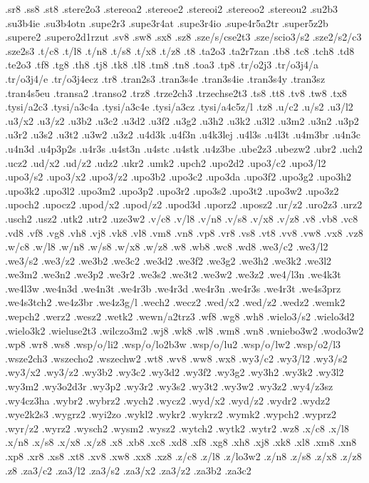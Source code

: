 {.sr8
.ss8
.st8
.stere2o3
.stereoa2
.stereoe2
.stereoi2
.stereoo2
.stereou2
.su2b3
.su3b4ie
.su3b4otn
.supe2r3
.supe3r4at
.supe3r4io
.supe4r5a2tr
.super5z2b
.supere2
.supero2d1rzut
.sv8
.sw8
.sx8
.sz8
.sze/s/cse2t3
.sze/scio3/s2
.sze2/s2/c3
.sze2s3
.t/c8
.t/l8
.t/n8
.t/s8
.t/x8
.t/z8
.t8
.ta2o3
.ta2r7zan
.tb8
.tc8
.tch8
.td8
.te2o3
.tf8
.tg8
.th8
.tj8
.tk8
.tl8
.tm8
.tn8
.toa3
.tp8
.tr/o2j3
.tr/o3j4/a
.tr/o3j4/e
.tr/o3j4ecz
.tr8
.tran2s3
.tran3s4e
.tran3s4ie
.tran3s4y
.tran3sz
.tran4s5eu
.transa2
.transo2
.trz8
.trze2ch3
.trzechse2t3
.ts8
.tt8
.tv8
.tw8
.tx8
.tysi/a2c3
.tysi/a3c4a
.tysi/a3c4e
.tysi/a3cz
.tysi/a4c5z/l
.tz8
.u/c2
.u/s2
.u3/l2
.u3/x2
.u3/z2
.u3b2
.u3c2
.u3d2
.u3f2
.u3g2
.u3h2
.u3k2
.u3l2
.u3m2
.u3n2
.u3p2
.u3r2
.u3s2
.u3t2
.u3w2
.u3z2
.u4d3k
.u4f3n
.u4k3lej
.u4l3s
.u4l3t
.u4m3br
.u4n3c
.u4n3d
.u4p3p2s
.u4r3s
.u4st3n
.u4stc
.u4stk
.u4z3be
.ube2z3
.ubezw2
.ubr2
.uch2
.ucz2
.ud/x2
.ud/z2
.udz2
.ukr2
.umk2
.upch2
.upo2d2
.upo3/c2
.upo3/l2
.upo3/s2
.upo3/x2
.upo3/z2
.upo3b2
.upo3c2
.upo3da
.upo3f2
.upo3g2
.upo3h2
.upo3k2
.upo3l2
.upo3m2
.upo3p2
.upo3r2
.upo3s2
.upo3t2
.upo3w2
.upo3z2
.upoch2
.upocz2
.upod/x2
.upod/z2
.upod3d
.uporz2
.uposz2
.ur/z2
.uro2z3
.urz2
.usch2
.usz2
.utk2
.utr2
.uze3w2
.v/c8
.v/l8
.v/n8
.v/s8
.v/x8
.v/z8
.v8
.vb8
.vc8
.vd8
.vf8
.vg8
.vh8
.vj8
.vk8
.vl8
.vm8
.vn8
.vp8
.vr8
.vs8
.vt8
.vv8
.vw8
.vx8
.vz8
.w/c8
.w/l8
.w/n8
.w/s8
.w/x8
.w/z8
.w8
.wb8
.wc8
.wd8
.we3/c2
.we3/l2
.we3/s2
.we3/z2
.we3b2
.we3c2
.we3d2
.we3f2
.we3g2
.we3h2
.we3k2
.we3l2
.we3m2
.we3n2
.we3p2
.we3r2
.we3s2
.we3t2
.we3w2
.we3z2
.we4/l3n
.we4k3t
.we4l3w
.we4n3d
.we4n3t
.we4r3b
.we4r3d
.we4r3n
.we4r3s
.we4r3t
.we4s3prz
.we4s3tch2
.we4z3br
.we4z3g/l
.wech2
.wecz2
.wed/x2
.wed/z2
.wedz2
.wemk2
.wepch2
.werz2
.wesz2
.wetk2
.wewn/a2trz3
.wf8
.wg8
.wh8
.wielo3/s2
.wielo3d2
.wielo3k2
.wieluse2t3
.wilczo3m2
.wj8
.wk8
.wl8
.wm8
.wn8
.wniebo3w2
.wodo3w2
.wp8
.wr8
.ws8
.wsp/o/li2
.wsp/o/lo2b3w
.wsp/o/lu2
.wsp/o/lw2
.wsp/o2/l3
.wsze2ch3
.wszecho2
.wszechw2
.wt8
.wv8
.ww8
.wx8
.wy3/c2
.wy3/l2
.wy3/s2
.wy3/x2
.wy3/z2
.wy3b2
.wy3c2
.wy3d2
.wy3f2
.wy3g2
.wy3h2
.wy3k2
.wy3l2
.wy3m2
.wy3o2d3r
.wy3p2
.wy3r2
.wy3s2
.wy3t2
.wy3w2
.wy3z2
.wy4/z3sz
.wy4cz3ha
.wybr2
.wybrz2
.wych2
.wycz2
.wyd/x2
.wyd/z2
.wydr2
.wydz2
.wye2k2s3
.wygrz2
.wyi2zo
.wykl2
.wykr2
.wykrz2
.wymk2
.wypch2
.wyprz2
.wyr/z2
.wyrz2
.wysch2
.wysm2
.wysz2
.wytch2
.wytk2
.wytr2
.wz8
.x/c8
.x/l8
.x/n8
.x/s8
.x/x8
.x/z8
.x8
.xb8
.xc8
.xd8
.xf8
.xg8
.xh8
.xj8
.xk8
.xl8
.xm8
.xn8
.xp8
.xr8
.xs8
.xt8
.xv8
.xw8
.xx8
.xz8
.z/c8
.z/l8
.z/lo3w2
.z/n8
.z/s8
.z/x8
.z/z8
.z8
.za3/c2
.za3/l2
.za3/s2
.za3/x2
.za3/z2
.za3b2
.za3c2
}
